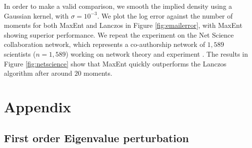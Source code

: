 \documentclass[letterpaper]{article} %
\begin{document}
\label{smoothinglancsoz}
In order to make a valid comparison, we smooth the implied density using a Gaussian kernel, with $\sigma = 10^{-3}$. %
We plot the log error against the number of moments for both MaxEnt and Lanczos in Figure \ref{fig:emailerror}, with MaxEnt showing superior performance.
We repeat the experiment on the Net Science collaboration network, which represents a co-authorship network of $1,589$ scientists ($n = 1,589$) working on network theory and experiment \citep{newman2006finding}. The results in Figure \ref{fig:netscience} show that MaxEnt quickly outperforms the Lanczos algorithm after around $20$ moments.

\section{Appendix}
\subsection{First order Eigenvalue perturbation}
\end{document}
